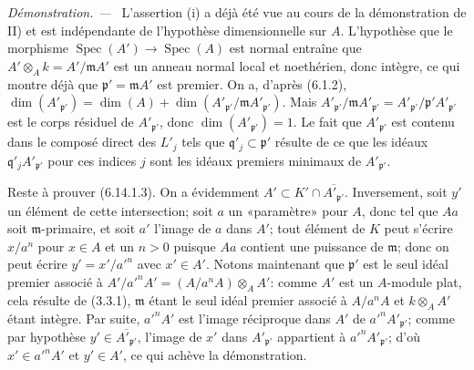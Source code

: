 \documentclass[10pt,oneside]{book}
\newcommand{\oldpage}[2][]{%
  \setcounter{footnote}{0}%
  \marginpar{\scriptsize\textbf{#1}~|~#2}\ignorespaces}
\newenvironment{proof}{%
  \par\medskip\noindent\textit{Démonstration. ---\ }}{\par}
\begin{document}
\begin{proof}
\oldpage[IV-2]{172}
L'assertion (i) a déjà été vue au cours de la démonstration de II) et est
indépendante de l'hypothèse dimensionnelle sur $A$. L'hypothèse que le
morphisme $\operatorname{Spec}(A')\to\operatorname{Spec}(A)$ est normal
entraîne que $A'\otimes_A k=A'/\mathfrak mA'$ est un anneau normal local et
noethérien, donc intègre, ce qui montre déjà que
$\mathfrak p'=\mathfrak mA'$ est premier. On a, d'après (6.1.2),
$\dim(A'_{\mathfrak p'})=\dim(A)+
\dim(A'_{\mathfrak p'}/\mathfrak mA'_{\mathfrak p'})$. Mais
$A'_{\mathfrak p'}/\mathfrak mA'_{\mathfrak p'}=
A'_{\mathfrak p'}/\mathfrak p'A'_{\mathfrak p'}$ est le corps résiduel de
$A'_{\mathfrak p'}$, donc $\dim(A'_{\mathfrak p'})=1$. Le fait que
$A'_{\mathfrak p'}$ est contenu dans le composé direct des $L'_j$ tels que
$\mathfrak q'_j\subset\mathfrak p'$ résulte de ce que les idéaux
$\mathfrak q'_jA'_{\mathfrak p'}$ pour ces indices $j$ sont les idéaux
premiers minimaux de $A'_{\mathfrak p'}$.

Reste à prouver (6.14.1.3). On a évidemment
$A'\subset K'\cap\overline{A'_{\mathfrak p'}}$. Inversement, soit $y'$ un
élément de cette intersection; soit $a$ un «paramètre» pour $A$, donc tel
que $Aa$ soit $\mathfrak m$-primaire, et soit $a'$ l'image de $a$ dans
$A'$; tout élément de $K$ peut s'écrire $x/a^n$ pour $x\in A$ et un $n>0$
puisque $Aa$ contient une puissance de $\mathfrak m$; donc on peut écrire
$y'=x'/a'^n$ avec $x'\in A'$. Notons maintenant que $\mathfrak p'$ est le
seul idéal premier associé à
$A'/a'^nA'=(A/a^nA)\otimes_A A'$: comme $A'$ est un $A$-module plat, cela
résulte de (3.3.1), $\mathfrak m$ étant le seul idéal premier associé à
$A/a^nA$ et $k\otimes_A A'$ étant intègre. Par suite, $a'^nA'$ est l'image
réciproque dans $A'$ de $a'^nA'_{\mathfrak p'}$; comme par hypothèse
$y'\in\overline{A'_{\mathfrak p'}}$, l'image de $x'$ dans
$A'_{\mathfrak p'}$ appartient à $a'^nA'_{\mathfrak p'}$; d'où
$x'\in a'^nA'$ et $y'\in A'$, ce qui achève la démonstration.


\end{proof}
\end{document}
